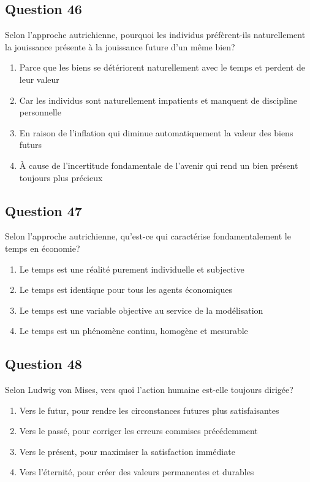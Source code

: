 \documentclass[12pt,a4paper]{article}
\begin{document}
\bigskip


\subsection*{Question 46}
Selon l'approche autrichienne, pourquoi les individus préfèrent-ils naturellement la jouissance présente à la jouissance future d'un même bien?

\begin{enumerate}[label=\Alph*., leftmargin=*]
\item Parce que les biens se détériorent naturellement avec le temps et perdent de leur valeur
\item Car les individus sont naturellement impatients et manquent de discipline personnelle
\item En raison de l'inflation qui diminue automatiquement la valeur des biens futurs
\item À cause de l'incertitude fondamentale de l'avenir qui rend un bien présent toujours plus précieux
\end{enumerate}

\bigskip


\subsection*{Question 47}
Selon l'approche autrichienne, qu'est-ce qui caractérise fondamentalement le temps en économie?

\begin{enumerate}[label=\Alph*., leftmargin=*]
\item Le temps est une réalité purement individuelle et subjective
\item Le temps est identique pour tous les agents économiques
\item Le temps est une variable objective au service de la modélisation
\item Le temps est un phénomène continu, homogène et mesurable
\end{enumerate}

\bigskip


\subsection*{Question 48}
Selon Ludwig von Mises, vers quoi l'action humaine est-elle toujours dirigée?

\begin{enumerate}[label=\Alph*., leftmargin=*]
\item Vers le futur, pour rendre les circonstances futures plus satisfaisantes
\item Vers le passé, pour corriger les erreurs commises précédemment
\item Vers le présent, pour maximiser la satisfaction immédiate
\item Vers l'éternité, pour créer des valeurs permanentes et durables
\end{enumerate}
\end{document}
